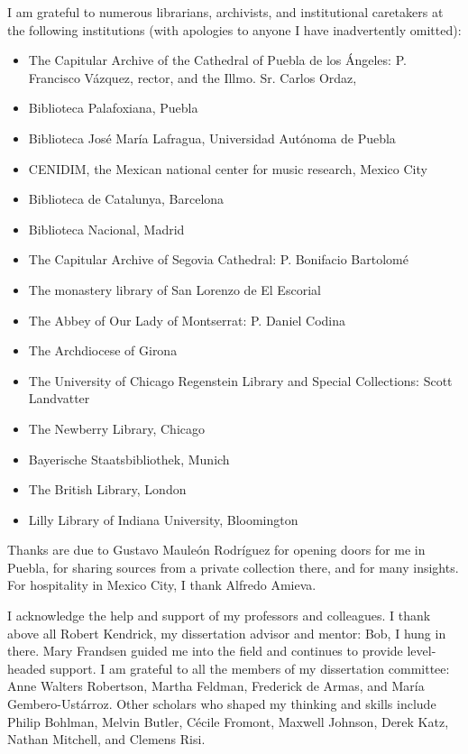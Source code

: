I am grateful to numerous librarians, archivists, and institutional
caretakers at the following institutions (with apologies to anyone I have
inadvertently omitted):
\begin{itemize}
    \item The Capitular Archive of the Cathedral of Puebla de los Ángeles:
        P. Francisco Vázquez, rector, and the Illmo. Sr. Carlos
        Ordaz, 
    \item Biblioteca Palafoxiana, Puebla
    \item Biblioteca José María Lafragua, Universidad Autónoma de Puebla
    \item CENIDIM, the Mexican national center for music research, Mexico
        City
    \item Biblioteca de Catalunya, Barcelona
    \item Biblioteca Nacional, Madrid
    \item The Capitular Archive of Segovia Cathedral: P. Bonifacio Bartolomé
    \item The monastery library of San Lorenzo de El Escorial
    \item The Abbey of Our Lady of Montserrat: P. Daniel Codina
    \item The Archdiocese of Girona
    \item The University of Chicago Regenstein Library and Special
        Collections: Scott Landvatter
    \item The Newberry Library, Chicago
    \item Bayerische Staatsbibliothek, Munich
    \item The British Library, London
    \item Lilly Library of Indiana University, Bloomington
\end{itemize}
Thanks are due to Gustavo Mauleón Rodríguez for opening doors for me in
Puebla, for sharing sources from a private collection there, and for many
insights.
For hospitality in Mexico City, I thank Alfredo Amieva.

I acknowledge the help and support of my professors and colleagues.
I thank above all Robert Kendrick, my dissertation advisor and mentor: 
Bob, I hung in there. 
Mary Frandsen guided me into the field and continues to provide level-headed
support.
I am grateful to all the members of my dissertation committee: Anne Walters
Robertson, Martha Feldman, Frederick de Armas, and María Gembero-Ustárroz.
Other scholars who shaped my thinking and skills include 
Philip Bohlman,
Melvin Butler, 
Cécile Fromont, 
Maxwell Johnson, 
Derek Katz, 
Nathan Mitchell,
and 
Clemens Risi.

